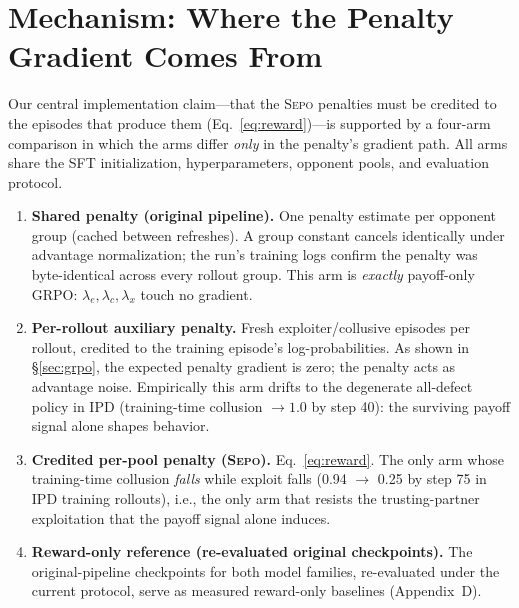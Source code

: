 \documentclass[letterpaper]{article} %
\newcommand{\sepo}{\textsc{Sepo}}
\begin{document}
\section{Mechanism: Where the Penalty Gradient Comes From}
\label{sec:mechanism}
Our central implementation claim---that the \sepo{} penalties must be credited to the episodes that produce them (Eq.~\ref{eq:reward})---is supported by a four-arm comparison in which the arms differ \emph{only} in the penalty's gradient path. All arms share the SFT initialization, hyperparameters, opponent pools, and evaluation protocol.
\begin{enumerate}[leftmargin=1.2em,noitemsep]
\item \textbf{Shared penalty (original pipeline).} One penalty estimate per opponent group (cached between refreshes). A group constant cancels identically under advantage normalization; the run's training logs confirm the penalty was byte-identical across every rollout group. This arm is \emph{exactly} payoff-only GRPO: $\lambda_e, \lambda_c, \lambda_x$ touch no gradient.
\item \textbf{Per-rollout auxiliary penalty.} Fresh exploiter/collusive episodes per rollout, credited to the training episode's log-probabilities. As shown in \S\ref{sec:grpo}, the expected penalty gradient is zero; the penalty acts as advantage noise. Empirically this arm drifts to the degenerate all-defect policy in IPD (training-time collusion $\to 1.0$ by step 40): the surviving payoff signal alone shapes behavior.
\item \textbf{Credited per-pool penalty (\sepo{}).} Eq.~\ref{eq:reward}. The only arm whose training-time collusion \emph{falls} while exploit falls (0.94 $\to$ 0.25 by step 75 in IPD training rollouts), i.e., the only arm that resists the trusting-partner exploitation that the payoff signal alone induces.
\item \textbf{Reward-only reference (re-evaluated original checkpoints).} The original-pipeline checkpoints for both model families, re-evaluated under the current protocol, serve as measured reward-only baselines (Appendix~D).
\end{enumerate}
\end{document}
